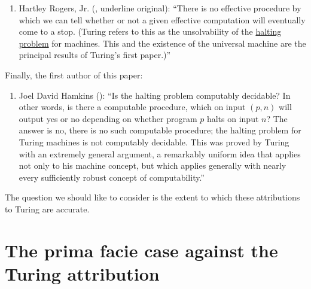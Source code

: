 \documentclass{amsart}
\begin{document}
\begin{enumerate}
 \bigskip 

    \item Hartley Rogers, Jr. (\cite[p. 19]{rogers1987theory}, underline original): \enquote{There is no effective procedure by which we can tell whether or not a given effective computation will eventually come to a stop. (Turing refers to this as the unsolvability of the \underline{halting problem} for machines. This and the existence of the universal machine are the principal results of Turing's first paper.)}

\end{enumerate}

\bigskip

\noindent Finally, the first author of this paper:

\bigskip

\begin{enumerate}[resume]\small
    \item  Joel David Hamkins (\cite[\S6.5]{Hamkins2021:Lectures-on-the-philosophy-of-mathematics}): ``Is the halting problem computably decidable? In other words, is there a computable procedure, which on input $(p,n)$ will output yes or no depending on whether program $p$ halts on input $n$? The answer is no, there is no such computable procedure; the halting problem for Turing machines is not computably decidable. This was proved by Turing with an extremely general argument, a remarkably uniform idea that applies not only to his machine concept, but which applies generally with nearly every sufficiently robust concept of computability.''

\end{enumerate}
The question we should like to consider is the extent to which these attributions to Turing are accurate. 

\section{The prima facie case against the Turing attribution}
\end{document}
